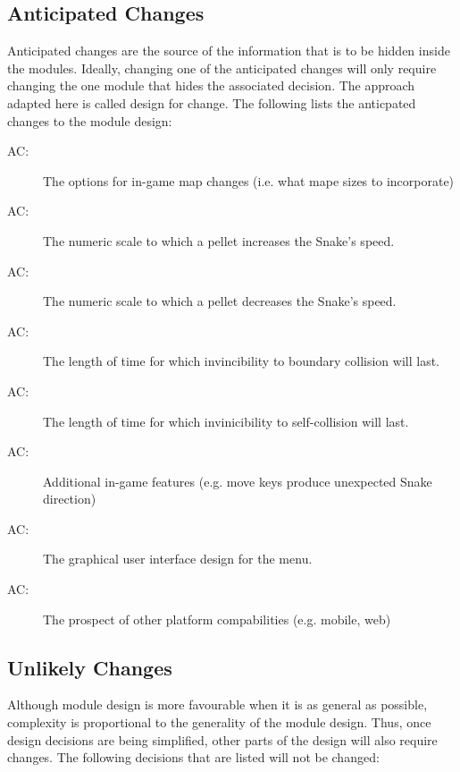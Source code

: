 \documentclass[12pt, titlepage]{article}
\newcounter{acnum}
\newcommand{\actheacnum}{AC\theacnum}
\begin{document}
\subsection{Anticipated Changes} \label{SecAchange}

Anticipated changes are the source of the information that is to be hidden
inside the modules. Ideally, changing one of the anticipated changes will only
require changing the one module that hides the associated decision. The approach
adapted here is called design for change. The following lists the anticpated changes to the module design:

\begin{description}
\item[ \actheacnum \label{acMapChanges}:] The options for in-game map changes (i.e. what mape sizes to incorporate)
\item[ \actheacnum \label{acSpeedUp}:] The numeric scale to which a pellet increases the Snake's speed.
\item[ \actheacnum \label{acSpeedDown}:] The numeric scale to which a pellet decreases the Snake's speed.
\item[ \actheacnum \label{acBoundaryCollision}:] The length of time for which invincibility to boundary collision will last.
\item[ \actheacnum \label{acSelfCollision}:] The length of time for which invinicibility to self-collision will last.
\item[ \actheacnum \label{acAdditional}:] Additional in-game features (e.g. move keys produce unexpected Snake direction)
\item[ \actheacnum \label{acMenuGUI}:] The graphical user interface design for the menu.
\item[ \actheacnum \label{acHardware}:] The prospect of other platform compabilities (e.g. mobile, web)
\end{description}

\subsection{Unlikely Changes} \label{SecUchange}

Although module design is more favourable when it is as general as possible, complexity is proportional to the generality of the module design. Thus, once design decisions are being simplified, other parts of the design will also require changes. The following decisions that are listed will not be changed:
\end{document}
